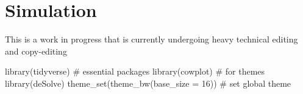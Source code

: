 \documentclass[
  letterpaper,
  DIV=11,
  numbers=noendperiod]{scrreprt}
\newenvironment{Shaded}{\begin{snugshade}}{\end{snugshade}}
\newcommand{\AttributeTok}[1]{\textcolor[rgb]{0.40,0.45,0.13}{#1}}
\newcommand{\CommentTok}[1]{\textcolor[rgb]{0.37,0.37,0.37}{#1}}
\newcommand{\DecValTok}[1]{\textcolor[rgb]{0.68,0.00,0.00}{#1}}
\newcommand{\FunctionTok}[1]{\textcolor[rgb]{0.28,0.35,0.67}{#1}}
\newcommand{\NormalTok}[1]{\textcolor[rgb]{0.00,0.23,0.31}{#1}}
\begin{document}
\hypertarget{simulation}{%
\chapter{Simulation}\label{simulation}}

\begin{tcolorbox}[enhanced jigsaw, rightrule=.15mm, left=2mm, breakable, colframe=quarto-callout-note-color-frame, toprule=.15mm, leftrule=.75mm, bottomrule=.15mm, colback=white, arc=.35mm, opacityback=0]
\begin{minipage}[t]{5.5mm}
\textcolor{quarto-callout-note-color}{\faInfo}
\end{minipage}%
\begin{minipage}[t]{\textwidth - 5.5mm}
This is a work in progress that is currently undergoing heavy technical
editing and copy-editing\end{minipage}%
\end{tcolorbox}

\begin{Shaded}
\begin{Highlighting}[]
\FunctionTok{library}\NormalTok{(tidyverse) }\CommentTok{\# essential packages }
\FunctionTok{library}\NormalTok{(cowplot) }\CommentTok{\# for themes }
\FunctionTok{library}\NormalTok{(deSolve)}
\FunctionTok{theme\_set}\NormalTok{(}\FunctionTok{theme\_bw}\NormalTok{(}\AttributeTok{base\_size =} \DecValTok{16}\NormalTok{)) }\CommentTok{\# set global theme}
\end{Highlighting}
\end{Shaded}
\end{document}
